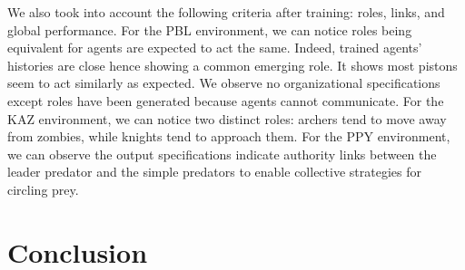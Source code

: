 \documentclass{ecai}
\newcounter{relation}
\newcounter{proof}
\begin{document}
We also took into account the following criteria after training: roles, links, and global performance.
%
% 
%
%
For the PBL environment, we can notice roles being equivalent for agents are expected to act the same. Indeed, trained agents' histories are close hence showing a common emerging role.
It shows most pistons seem to act similarly as expected. We observe no organizational specifications except roles have been generated because agents cannot communicate. For the KAZ environment, we can notice two distinct roles: archers tend to move away from zombies, while knights tend to approach them. For the PPY environment, we can observe the output specifications indicate authority links between the leader predator and the simple predators to enable collective strategies for circling prey.

\section{Conclusion}




\end{document}
